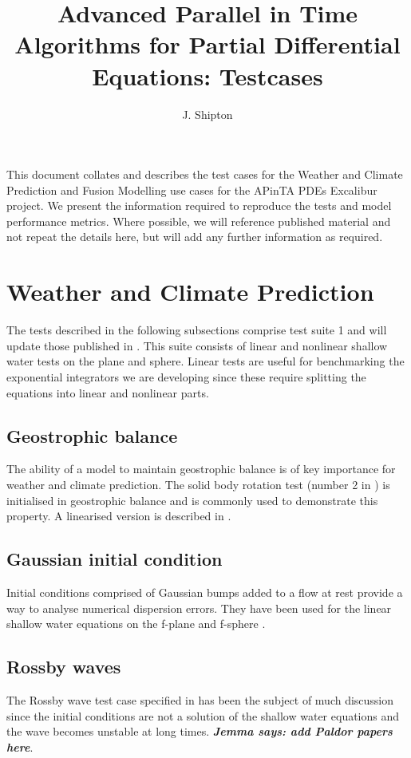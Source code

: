 \documentclass{article}
\title{Advanced Parallel in Time Algorithms for Partial Differential Equations: Testcases}
\author{J. Shipton}
\newcommand{\Jemmacomment}[1]{\emph{\bfseries Jemma says: #1}}
\begin{document}
\maketitle

This document collates and describes the test cases for the Weather
and Climate Prediction and Fusion Modelling use cases for the APinTA
PDEs Excalibur project. We present the information required to
reproduce the tests and model performance metrics. Where possible, we
will reference published material and not repeat the details here, but
will add any further information as required.

\section*{Weather and Climate Prediction}

The tests described in the following subsections comprise test suite 1
and will update those published in
\citet{williamson1992standard}. This suite consists of linear and
nonlinear shallow water tests on the plane and sphere. Linear tests
are useful for benchmarking the exponential integrators we are
developing since these require splitting the equations into linear and
nonlinear parts.

\subsection{Geostrophic balance}
The ability of a model to maintain geostrophic balance is of key
importance for weather and climate prediction. The solid body rotation
test (number 2 in \citet{williamson1992standard}) is initialised in
geostrophic balance and is commonly used to demonstrate this
property. A linearised version is described in
\citet{weller2012computational}.

\subsection{Gaussian initial condition}
Initial conditions comprised of Gaussian bumps added to a flow at rest
provide a way to analyse numerical dispersion errors. They have been
used for the linear shallow water equations on the f-plane and
f-sphere \citep{schreiber2018beyond, schreiber2019parallel}.

\subsection{Rossby waves}
The Rossby wave test case specified in \citet{williamson1992standard}
has been the subject of much discussion since the initial conditions
are not a solution of the shallow water equations and the wave becomes
unstable at long times. \Jemmacomment{add Paldor papers here}.
\end{document}

